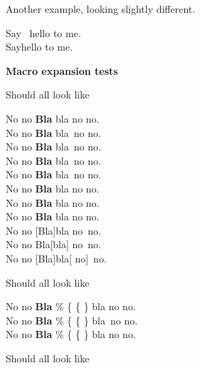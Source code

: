 Another example, looking slightly different.

Say \ hello to me.\\
Say\xf{}hello to me.


\begin{lcHtmlBlock}
{\bf Macro expansion tests}

Should all look like

No no \textbf{Bla} bla no no.\\
%
\newcommand{\macro}{\textbf{Bla} bla}
No no \macro\ no no.\\
%
\def\macroa{\textbf{Bla} bla}
No no \macroa\ no no.\\
%
\newcommand{\macrob} %

  {\textbf{Bla}  bla}
%
No no \macrob\ no no.\\
%
\newcommand{\macroc}{\textbf{Bla} %
  bla}
%
No no \macroc\ no no.\\
%
\newcommand{\a}[1]{\textbf{#1} bla}
%
No no \a{Bla} no no.\\
%
\def\aa #1{\textbf{#1} bla}
%
No no \aa{Bla} no no.\\
%
\def\aaa #1#2#3{\textbf{#3#2#1} bla}
%
No no \aaa alB no no.\\
%
\newcommand{\b}[1]{ #1}
\newcommand{\b@om}{\textbf{#1} #2}
%
No no \b[Bla]{bla}\b{no}\ no.\\
%
\newcommand{\bb}[1]{ #1}
\newcommand{\bb@mo}{\textbf{#1} #2}
%
No no \bb{Bla}[bla]\bb{no}\ no.\\
%
\newcommand{\bb@omo}{\textbf{#1} #2#3}
No no \bb[Bla]{bla}[ no]\ no.


Should all look like

No no \textbf{Bla} \% \{ \{ \} bla no no.\\
%
\newcommand{\macrod}{\textbf{Bla} \% \{ \{ \} bla}
No no \macrod\ no no.\\
%
\newcommand{\|}{\textbf{Bla} \% \{ \{ \} bla}
%
No no \| no no.

Should all look like


\end{lcHtmlBlock}

